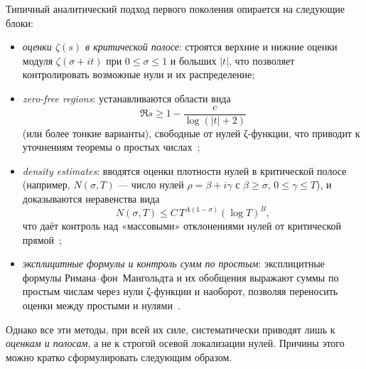 \documentclass{article}
\numberwithin{equation}{section}
\theoremstyle{plain}
\theoremstyle{definition}
\theoremstyle{remark}
\def\rho{ρ}\def\sigma{σ}\def\Sigma{Σ}\def\tau{τ}%
\begin{document}
Типичный аналитический подход первого поколения опирается на следующие блоки:
\begin{itemize}
  \item \emph{оценки $\zeta(s)$ в критической полосе}: 
  строятся верхние и нижние оценки модуля $\zeta(\sigma+it)$ при $0\le \sigma\le 1$ и больших $|t|$, что позволяет контролировать возможные нули и их распределение;
  \item \emph{zero-free regions}: 
  устанавливаются области вида
  \begin{equation}
  \label{eq:intro-zero-free-region}
  \Re s \ge 1-\frac{c}{\log(|t|+2)}
  \end{equation}
  (или более тонкие варианты), свободные от нулей ζ-функции, что приводит к уточнениям теоремы о простых числах~\cite{ValleePoussin1899,KorobovVinogradov1962};
  \item \emph{density estimates}: 
  вводятся оценки плотности нулей в критической полосе (например, $N(\sigma,T)$ — число нулей $\rho=\beta+i\gamma$ с $\beta\ge\sigma$, $0\le\gamma\le T$), и доказываются неравенства вида
  \begin{equation}
  \label{eq:intro-density-estimate}
  N(\sigma,T)\le C\,T^{A(1-\sigma)}(\log T)^B,
  \end{equation}
  что даёт контроль над «массовыми» отклонениями нулей от критической прямой~\cite{Ingham1932,Montgomery1971};
  \item \emph{эксплицитные формулы и контроль сумм по простым}: 
  эксплицитные формулы Римана–фон~Мангольдта и их обобщения выражают суммы по простым числам через нули ζ-функции и наоборот, позволяя переносить оценки между простыми и нулями~\cite{Edwards1974,IK2004}.
\end{itemize}

\noindent
Однако все эти методы, при всей их силе, систематически приводят лишь к \emph{оценкам и полосам}, а не к строгой осевой локализации нулей. 
Причины этого можно кратко сформулировать следующим образом.
\end{document}
